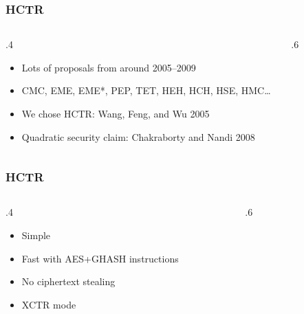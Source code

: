 \documentclass[aspectratio=169]{beamer}
\newenvironment*{figslide}{
    \begin{columns}
        \begin{column}{.4\textwidth}

}{
\end{column}
\begin{column}{.6\textwidth}
    \begin{figure}
        
    \end{figure}
\end{column}
\end{columns}
}
\begin{document}
\begin{frame}

    \frametitle{HCTR}
        \begin{figslide}
            \begin{itemize}
                \item Lots of proposals from around 2005--2009
                \item CMC, EME, EME*, PEP, TET, HEH, HCH, HSE, HMC\ldots
                \item We chose HCTR: Wang, Feng, and Wu 2005
                \item Quadratic security claim: Chakraborty and Nandi 2008
            \end{itemize}
        \end{figslide}
    \end{frame}
    \begin{frame}

\frametitle{HCTR}
    \begin{figslide}
        \begin{itemize}
            \item Simple
            \item Fast with AES+GHASH instructions
            \item No ciphertext stealing
            \item XCTR mode
        \end{itemize}
    \end{figslide}
\end{frame}
\end{document}
